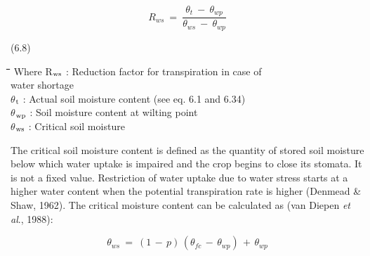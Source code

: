 \documentclass[11pt]{article}
\begin{document}
\begin{displaymath}
R _{ws} ~=~{\frac{\theta  _{t} ~-~ \theta  _{wp} }{ \theta  _{ws} ~-~ \theta  _{wp} }}
\end{displaymath}

 \bigskip
\strut\hfill (6.8)

\nwln
\begin{tabbing}
\hspace{1.27cm}\=\hspace{1.27cm}\=\hspace{1.27cm}\=\hspace{1.27cm}\=%
\hspace{1.27cm}\=\hspace{1.27cm}\=\hspace{1.27cm}\=\hspace{1.27cm}\=%
\hspace{1.27cm}\=\hspace{1.27cm}\=\kill
Where\> \> R$_{{\rm ws}}$\> : Reduction factor for transpiration in case of\\
\>\> \>   water shortage\> \> \> \> \> \> \> [-]\\
\>\> $\theta$$_{{\rm t}}$\> : Actual soil moisture content (see eq. 6.1 and 6.34)\> \> \> \> \> \> \> [cm$^{{\rm 3}}$ cm$^{{\rm -3}}$]\\
\>\> $\theta$$_{{\rm wp}}$\> : Soil moisture content at wilting point\> \> \> \> \> \> \> [cm$^{{\rm 3}}$ cm$^{{\rm -3}}$]\\
\>\> $\theta$$_{{\rm ws}}$\> : Critical soil moisture\> \> \> \> \> \> \> [cm$^{{\rm 3}}$ cm$^{{\rm -3}}$]
\end{tabbing}

\bigskip
\bigskip
The critical soil moisture content is defined as the quantity of stored soil moisture below
which water uptake is impaired and the crop begins to close its stomata. It is not a fixed
value. Restriction of water uptake due to water stress starts at a higher water content
when the potential transpiration rate is higher (Denmead \& Shaw, 1962). The critical
moisture content can be calculated as (van Diepen {\it et al\/}., 1988):

\begin{displaymath}
\theta  _{ws} ~=~ (1\, -\, p )\, (\theta  _{fc} \, -\, \theta  _{wp} )\, +\, \theta  _{wp} 
\end{displaymath}
\end{document}
